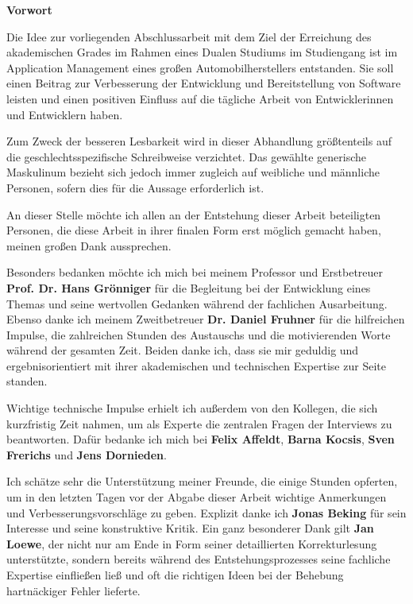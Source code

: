 \clearpage

{\LARGE\textbf{Vorwort}}
\vspace{1em}

\itshape

Die Idee zur vorliegenden Abschlussarbeit mit dem Ziel der Erreichung des akademischen Grades \degree\space im Rahmen eines Dualen Studiums im Studiengang \studies\space ist im Application Management eines großen Automobilherstellers entstanden. Sie soll einen Beitrag zur Verbesserung der Entwicklung und Bereitstellung von Software leisten und einen positiven Einfluss auf die tägliche Arbeit von Entwicklerinnen und Entwicklern haben.

Zum Zweck der besseren Lesbarkeit wird in dieser Abhandlung größtenteils auf die geschlechtsspezifische Schreibweise verzichtet. Das gewählte generische Maskulinum bezieht sich jedoch immer zugleich auf weibliche und männliche Personen, sofern dies für die Aussage erforderlich ist.

An dieser Stelle möchte ich allen an der Entstehung dieser Arbeit beteiligten Personen, die diese Arbeit in ihrer finalen Form erst möglich gemacht haben, meinen großen Dank aussprechen.

Besonders bedanken möchte ich mich bei meinem Professor und Erstbetreuer \textbf{Prof. Dr. Hans Grönniger} für die Begleitung bei der Entwicklung eines Themas und seine wertvollen Gedanken während der fachlichen Ausarbeitung. Ebenso danke ich meinem Zweitbetreuer \textbf{Dr. Daniel Fruhner} für die hilfreichen Impulse, die zahlreichen Stunden des Austauschs und die motivierenden Worte während der gesamten Zeit. Beiden danke ich, dass sie mir geduldig und ergebnisorientiert mit ihrer akademischen und technischen Expertise zur Seite standen.

Wichtige technische Impulse erhielt ich außerdem von den Kollegen, die sich kurzfristig Zeit nahmen, um als Experte die zentralen Fragen der Interviews zu beantworten. Dafür bedanke ich mich bei \textbf{Felix Affeldt}, \textbf{Barna Kocsis}, \textbf{Sven Frerichs} und \textbf{Jens Dornieden}.

Ich schätze sehr die Unterstützung meiner Freunde, die einige Stunden opferten, um in den letzten Tagen vor der Abgabe dieser Arbeit wichtige Anmerkungen und Verbesserungsvorschläge zu geben. Explizit danke ich \textbf{Jonas Beking} für sein Interesse und seine konstruktive Kritik. Ein ganz besonderer Dank gilt \textbf{Jan Loewe}, der nicht nur am Ende in Form seiner detaillierten Korrekturlesung unterstützte, sondern bereits während des Entstehungsprozesses seine fachliche Expertise einfließen ließ und oft die richtigen Ideen bei der Behebung hartnäckiger Fehler lieferte.

